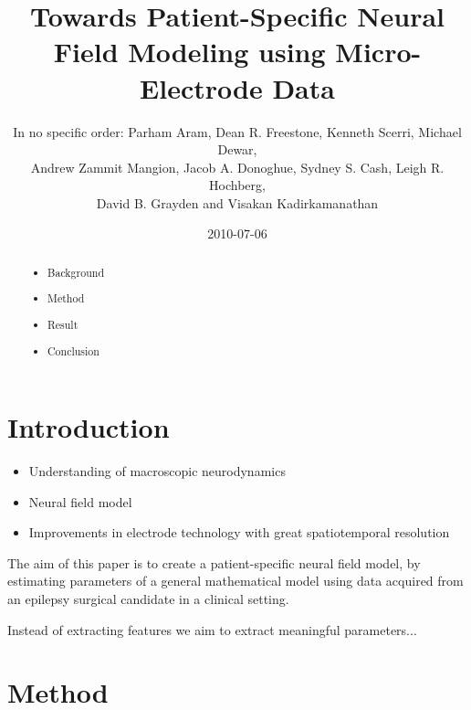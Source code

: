 \documentclass[]{article}
\title{Towards Patient-Specific Neural Field Modeling using Micro-Electrode Data}
\author{In no specific order: Parham Aram, Dean R. Freestone, Kenneth Scerri, Michael Dewar,\\
 Andrew Zammit Mangion, Jacob A. Donoghue, Sydney S. Cash, Leigh R. Hochberg,\\
 David B. Grayden and Visakan Kadirkamanathan  }
\date{2010-07-06}
\newif\ifpdf
\begin{document}
\ifpdf
\DeclareGraphicsExtensions{.pdf, .jpg, .tif}
\else
{}
\fi

\maketitle


\begin{abstract}
	
	\begin{itemize}
		\item Background
		\item Method
		\item Result
		\item Conclusion
	\end{itemize}
\end{abstract}

\section{Introduction}
\begin{itemize}
	\item Understanding of macroscopic neurodynamics
	\item Neural field model
	\item Improvements in electrode technology with great spatiotemporal resolution
\end{itemize}
The aim of this paper is to create a patient-specific neural field model, by estimating parameters of a general mathematical model using data acquired from an epilepsy surgical candidate in a clinical setting. 

Instead of extracting features we aim to extract meaningful parameters...

\section{Method}
\end{document}
